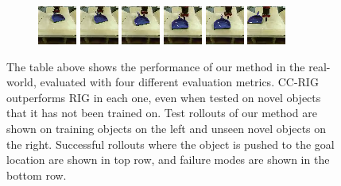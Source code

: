 \documentclass{article}
\begin{document}
\begin{figure}
\begin{subfigure}[b]{0.49\textwidth}
        \includegraphics[width=0.14\linewidth]{img/real_env_rollout_novel/0/0.png}
        \includegraphics[width=0.14\linewidth]{img/real_env_rollout_novel/0/1.png}
        \includegraphics[width=0.14\linewidth]{img/real_env_rollout_novel/0/2.png}
        \includegraphics[width=0.14\linewidth]{img/real_env_rollout_novel/0/3.png}
        \includegraphics[width=0.14\linewidth]{img/real_env_rollout_novel/0/4.png}
        \hspace{0.01\linewidth}
        \includegraphics[width=0.14\linewidth]{img/real_env_rollout_novel/0/goal.png}
    \end{subfigure}

    \caption{The table above shows the performance of our method in the real-world, evaluated with four different evaluation metrics\protect\footnotemark. CC-RIG outperforms RIG in each one, even when tested on novel objects that it has not been trained on.
    Test rollouts of our method are shown on training objects on the left and unseen novel objects on the right.
    Successful rollouts where the object is pushed to the goal location are shown in top row, and failure modes are shown in the bottom row. }
    \label{fig:realworld-robot-pushing-results}
\end{figure}
\end{document}

